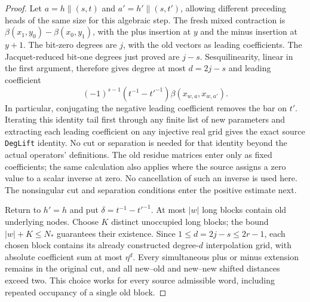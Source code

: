 \begin{proof}
Let $a=h\mathbin{\|}(s,t)$ and
$a'=h'\mathbin{\|}(s,t')$, allowing different preceding
heads of the same size for this algebraic step.
The fresh mixed contraction is
$\beta(x_1,y_0)-\beta(x_0,y_1)$, with the plus
insertion at $y$ and the minus insertion at $y+1$.
The bit-zero degrees are $j$, with the old vectors
as leading coefficients.  The Jacquet-reduced
bit-one degrees just proved are $j-s$.
Sesquilinearity, linear in the first argument,
therefore gives degree at most $d=2j-s$ and leading
coefficient
\begin{equation}\label{off-diagonal-leading}
        (-1)^{s-1}(t^{-1}-{t'}^{-1})
                       \beta(x_{w,a},x_{w,a'}).
\end{equation}
In particular, conjugating the negative leading
coefficient removes the bar on $t'$.
Iterating this identity tail first through any
finite list of new parameters and extracting each
leading coefficient on any injective real grid
gives the exact source \texttt{DegLift} identity.
No cut or separation is needed for that identity
beyond the actual operators' definitions.  The old
residue matrices enter only as fixed coefficients;
the same calculation also applies where the source
assigns a zero value to a scalar inverse at zero.
No cancellation of such an inverse is used here.
The nonsingular cut and separation conditions enter
the positive estimate next.

Return to $h'=h$ and put $\delta=t^{-1}-{t'}^{-1}$.
At most $|w|$ long blocks contain old underlying
nodes.  Choose $K$ distinct unoccupied long blocks;
the bound $|w|+K\le N_*$ guarantees their existence.
Since $1\le d=2j-s\le2r-1$, each chosen block
contains its already constructed degree-$d$
interpolation grid, with absolute coefficient sum
at most $\eta^d$.  Every simultaneous plus or
minus extension remains in the original cut,
and all new--old and new--new shifted distances
exceed two.  This choice works for every source
admissible word, including repeated occupancy of
a single old block.


\end{proof}
